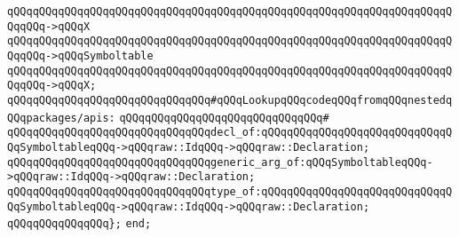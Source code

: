 \verb|qQQqqQQqqQQqqQQqqQQqqQQqqQQqqQQqqQQqqQQqqQQqqQQqqQQqqQQqqQQqqQQqqQQqqQQqqQQq->qQQqX|\newline
\verb|qQQqqQQqqQQqqQQqqQQqqQQqqQQqqQQqqQQqqQQqqQQqqQQqqQQqqQQqqQQqqQQqqQQqqQQqqQQq->qQQqSymboltable|\newline
\verb|qQQqqQQqqQQqqQQqqQQqqQQqqQQqqQQqqQQqqQQqqQQqqQQqqQQqqQQqqQQqqQQqqQQqqQQqqQQq->qQQqX;|\newline
\newline
\verb|qQQqqQQqqQQqqQQqqQQqqQQqqQQqqQQq#qQQqLookupqQQqcodeqQQqfromqQQqnestedqQQqpackages/apis:|\newline
\verb|qQQqqQQqqQQqqQQqqQQqqQQqqQQqqQQq#|\newline
\verb|qQQqqQQqqQQqqQQqqQQqqQQqqQQqqQQqdecl_of:qQQqqQQqqQQqqQQqqQQqqQQqqQQqqQQqSymboltableqQQq->qQQqraw::IdqQQq->qQQqraw::Declaration;|\newline
\verb|qQQqqQQqqQQqqQQqqQQqqQQqqQQqqQQqgeneric_arg_of:qQQqSymboltableqQQq->qQQqraw::IdqQQq->qQQqraw::Declaration;|\newline
\verb|qQQqqQQqqQQqqQQqqQQqqQQqqQQqqQQqtype_of:qQQqqQQqqQQqqQQqqQQqqQQqqQQqqQQqSymboltableqQQq->qQQqraw::IdqQQq->qQQqraw::Declaration;|\newline
\verb|qQQqqQQqqQQqqQQq};|\newline
\verb|end;|\newline

